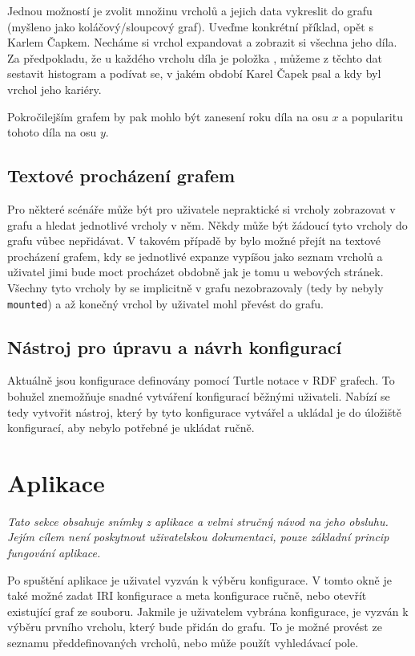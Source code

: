 Jednou možností je zvolit množinu vrcholů a jejich data vykreslit do grafu (myšleno jako koláčový/sloupcový graf). Uveďme konkrétní příklad, opět s Karlem Čapkem. Necháme si vrchol expandovat a zobrazit si všechna jeho díla. Za předpokladu, že u každého vrcholu díla je položka , můžeme z těchto dat sestavit histogram a podívat se, v jakém období Karel Čapek psal a kdy byl vrchol jeho kariéry.

Pokročilejším grafem by pak mohlo být zanesení roku díla na osu $x$ a popularitu tohoto díla na osu $y$.

\subsection*{Textové procházení grafem}
Pro některé scénáře může být pro uživatele nepraktické si vrcholy zobrazovat v grafu a hledat jednotlivé vrcholy v něm. Někdy může být žádoucí tyto vrcholy do grafu vůbec nepřidávat. V takovém případě by bylo možné přejít na textové procházení grafem, kdy se jednotlivé expanze vypíšou jako seznam vrcholů a uživatel jimi bude moct procházet obdobně jak je tomu u webových stránek. Všechny tyto vrcholy by se implicitně v grafu nezobrazovaly (tedy by nebyly \texttt{mounted}) a až konečný vrchol by uživatel mohl převést do grafu.

\subsection*{Nástroj pro úpravu a návrh konfigurací}
Aktuálně jsou konfigurace definovány pomocí Turtle notace v RDF grafech. To bohužel znemožňuje snadné vytváření konfigurací běžnými uživateli. Nabízí se tedy vytvořit nástroj, který by tyto konfigurace vytvářel a ukládal je do úložiště konfigurací, aby nebylo potřebné je ukládat ručně.

\section{Aplikace}
\textit{Tato sekce obsahuje snímky z aplikace a velmi stručný návod na jeho obsluhu. Jejím cílem není poskytnout uživatelskou dokumentaci, pouze základní princip fungování aplikace.}

Po spuštění aplikace je uživatel vyzván k výběru konfigurace. V tomto okně je také možné zadat IRI konfigurace a meta konfigurace ručně, nebo otevřít existující graf ze souboru. Jakmile je uživatelem vybrána konfigurace, je vyzván k výběru prvního vrcholu, který bude přidán do grafu. To je možné provést ze seznamu předdefinovaných vrcholů, nebo může použít vyhledávací pole.

